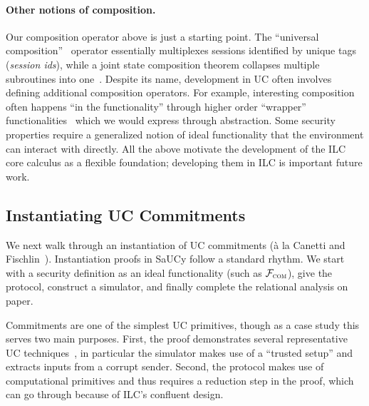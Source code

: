 \paragraph{Other notions of composition.}
Our composition operator above is just a starting point.
The ``universal composition''~\cite{canetti2001universally} operator essentially multiplexes sessions identified by unique tags (\emph{session ids}), while a joint state composition theorem collapses multiple subroutines into one~\cite{canetti2003universal}.
Despite its name, development in UC often involves defining additional composition operators. 
For example, interesting composition often happens ``in the functionality''
through higher order ``wrapper''
functionalities~\cite{kosba2016hawk,katz2007universally} which we would express
through abstraction. Some security properties require a generalized notion of
ideal functionality that the environment can interact with directly. All the
above motivate the development of the ILC core calculus as a flexible
foundation; developing them in ILC is important future work. 


\subsection{Instantiating UC Commitments}
\label{subsec:example}
We next walk through an instantiation of UC commitments (\`{a} la Canetti and
Fischlin~\cite{canetti2001commitments}).
Instantiation proofs in SaUCy follow a
standard rhythm. We start with a security definition as an ideal functionality
(such as $\mathcal{{F}}_{\textsc{com}}$), give the protocol, construct a simulator, and
finally complete the relational analysis on paper.

Commitments are one of the simplest UC primitives, though as a case study this serves two main purposes.
First, the proof demonstrates several representative UC techniques~\cite{lindell2017simulate}, in particular the simulator makes use of a ``trusted setup'' and extracts inputs from a corrupt sender.
Second, the protocol makes use of computational primitives and thus requires a reduction step in the proof, which can go through because of ILC's confluent design.


